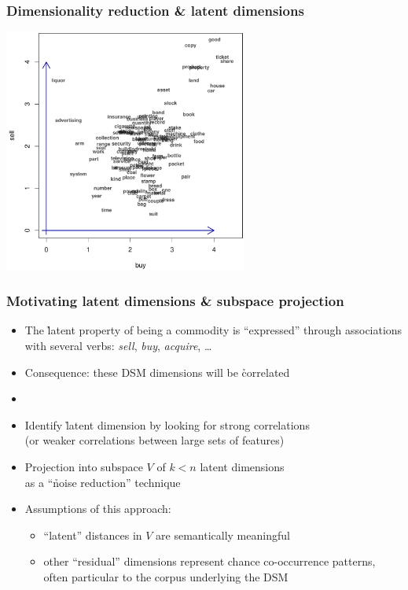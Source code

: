 \documentclass[t]{beamer} %
\begin{document}
\begin{frame}[c]
  \frametitle{Dimensionality reduction \& latent dimensions}
  \begin{center}
    \ungap[1]
    \includegraphics[width=8cm]{img/3_buy_sell_labels_only}
  \end{center}
\end{frame}

\begin{frame}
  \frametitle{Motivating latent dimensions \& subspace projection}

  \begin{itemize}
  \item The \h{latent property} of being a commodity is ``expressed''
    through associations with several verbs: \emph{sell}, \emph{buy},
    \emph{acquire}, \ldots
  \item Consequence: these DSM dimensions will be \h{correlated}
  \item[]\pause
  \item Identify \h{latent dimension} by looking for strong correlations\\
    (or weaker correlations between large sets of features)%
  \item Projection into subspace $V$ of $k < n$ latent dimensions\\
    as a ``\h{noise reduction}'' technique \so {}
  \item Assumptions of this approach:
    \begin{itemize}
    \item ``latent'' distances in $V$ are semantically meaningful
    \item other ``residual'' dimensions represent chance co-occurrence
      patterns, often particular to the corpus underlying the DSM
    \end{itemize}
  \end{itemize}
\end{frame}
\end{document}
